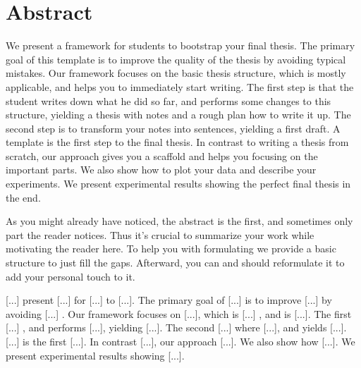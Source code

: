 \chapter{Abstract}

We present a framework for students to bootstrap your final thesis. The primary goal of this template is to improve the quality of the thesis by avoiding typical mistakes. Our framework focuses on the basic thesis structure, which is mostly applicable, and helps you to immediately start writing. The first step is that the student writes down what he did so far, and performs some changes to this structure, yielding a thesis with notes and a rough plan how to write it up. The second step is to transform your notes into sentences, yielding a first draft. A template is the first step to the final thesis. In contrast to writing a thesis from scratch, our approach gives you a scaffold and helps you focusing on the important parts. We also show how to plot your data and describe your experiments. We present experimental results showing the perfect final thesis in the end.

As you might already have noticed, the abstract is the first, and sometimes only part the reader notices.
Thus it's crucial to summarize your work while motivating the reader here.
To help you with formulating we provide a basic structure to just fill the gaps.
Afterward, you can and should reformulate it to add your personal touch to it.

[...] present [...] for [...] to [...]. The primary goal of [...] is to improve [...] by avoiding [...] . Our framework focuses on [...], which is [...] , and is [...]. The first [...] , and performs [...], yielding [...]. The second [...] where [...], and yields [...]. [...] is the first [...]. In contrast [...], our approach [...]. We also show how [...]. We present experimental results showing [...].
